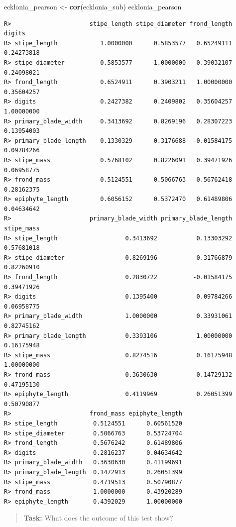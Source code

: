 \documentclass[english,10pt,a4paper,oneside]{book}
\newenvironment{Shaded}{\begin{snugshade}}{\end{snugshade}}
\newcommand{\KeywordTok}[1]{\textcolor[rgb]{0.13,0.29,0.53}{\textbf{#1}}}
\newcommand{\StringTok}[1]{\textcolor[rgb]{0.31,0.60,0.02}{#1}}
\newcommand{\NormalTok}[1]{#1}
\theoremstyle{definition}
\theoremstyle{definition}
\theoremstyle{definition}
\theoremstyle{remark}
\begin{document}
\begin{Shaded}
\begin{Highlighting}[]
\NormalTok{ecklonia_pearson <-}\StringTok{ }\KeywordTok{cor}\NormalTok{(ecklonia_sub)}
\NormalTok{ecklonia_pearson}
\end{Highlighting}
\end{Shaded}

\begin{verbatim}
R>                      stipe_length stipe_diameter frond_length     digits
R> stipe_length            1.0000000      0.5853577   0.65249111 0.24273818
R> stipe_diameter          0.5853577      1.0000000   0.39032107 0.24098021
R> frond_length            0.6524911      0.3903211   1.00000000 0.35604257
R> digits                  0.2427382      0.2409802   0.35604257 1.00000000
R> primary_blade_width     0.3413692      0.8269196   0.28307223 0.13954003
R> primary_blade_length    0.1330329      0.3176688  -0.01584175 0.09784266
R> stipe_mass              0.5768102      0.8226091   0.39471926 0.06958775
R> frond_mass              0.5124551      0.5066763   0.56762418 0.28162375
R> epiphyte_length         0.6056152      0.5372470   0.61489806 0.04634642
R>                      primary_blade_width primary_blade_length stipe_mass
R> stipe_length                   0.3413692           0.13303292 0.57681018
R> stipe_diameter                 0.8269196           0.31766879 0.82260910
R> frond_length                   0.2830722          -0.01584175 0.39471926
R> digits                         0.1395400           0.09784266 0.06958775
R> primary_blade_width            1.0000000           0.33931061 0.82745162
R> primary_blade_length           0.3393106           1.00000000 0.16175948
R> stipe_mass                     0.8274516           0.16175948 1.00000000
R> frond_mass                     0.3630630           0.14729132 0.47195130
R> epiphyte_length                0.4119969           0.26051399 0.50790877
R>                      frond_mass epiphyte_length
R> stipe_length          0.5124551      0.60561520
R> stipe_diameter        0.5066763      0.53724704
R> frond_length          0.5676242      0.61489806
R> digits                0.2816237      0.04634642
R> primary_blade_width   0.3630630      0.41199691
R> primary_blade_length  0.1472913      0.26051399
R> stipe_mass            0.4719513      0.50790877
R> frond_mass            1.0000000      0.43920289
R> epiphyte_length       0.4392029      1.00000000
\end{verbatim}

\begin{quote}
\textbf{Task:} What does the outcome of this test show?
\end{quote}
\end{document}
